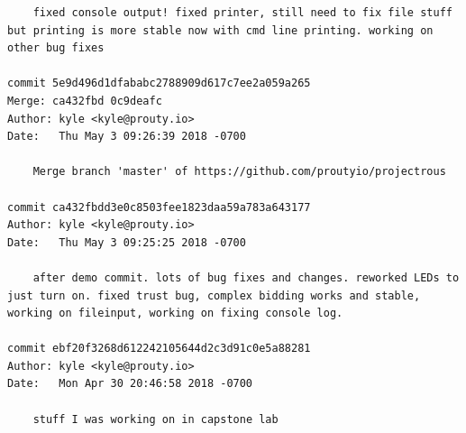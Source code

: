 \documentclass[draftclsnofoot, onecolumn, compsoc, 10pt]{IEEEtran}
\begin{document}
\begin{lstlisting}
    fixed console output! fixed printer, still need to fix file stuff but printing is more stable now with cmd line printing. working on other bug fixes 

commit 5e9d496d1dfababc2788909d617c7ee2a059a265 
Merge: ca432fbd 0c9deafc 
Author: kyle <kyle@prouty.io> 
Date:   Thu May 3 09:26:39 2018 -0700 

    Merge branch 'master' of https://github.com/proutyio/projectrous 

commit ca432fbdd3e0c8503fee1823daa59a783a643177 
Author: kyle <kyle@prouty.io> 
Date:   Thu May 3 09:25:25 2018 -0700 

    after demo commit. lots of bug fixes and changes. reworked LEDs to just turn on. fixed trust bug, complex bidding works and stable, working on fileinput, working on fixing console log. 

commit ebf20f3268d612242105644d2c3d91c0e5a88281 
Author: kyle <kyle@prouty.io> 
Date:   Mon Apr 30 20:46:58 2018 -0700 

    stuff I was working on in capstone lab 
\end{lstlisting}
\end{document}
